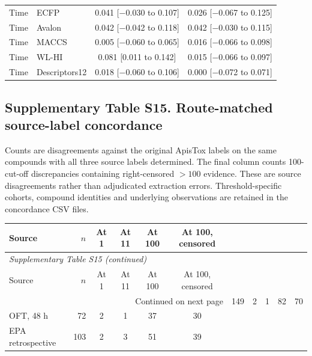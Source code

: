 \begin{longtable}{llcc}
Time & ECFP & 0.041 [$-$0.030 to 0.107] & 0.026 [$-$0.067 to 0.125] \\

Time & Avalon & 0.042 [$-$0.042 to 0.118] & 0.042 [$-$0.030 to 0.115] \\

Time & MACCS & 0.005 [$-$0.060 to 0.065] & 0.016 [$-$0.066 to 0.098] \\

Time & WL-HI & 0.081 [0.011 to 0.142] & 0.015 [$-$0.066 to 0.097] \\

Time & Descriptors12 & 0.018 [$-$0.060 to 0.106] & 0.000 [$-$0.072 to 0.071] \\

\end{longtable}\endgroup

\subsection*{Supplementary Table S15. Route-matched source-label concordance}

Counts are disagreements against the original ApisTox labels on the same compounds with all three source labels determined. The final column counts 100-cut-off discrepancies containing right-censored $>100$ evidence. These are source disagreements rather than adjudicated extraction errors. Threshold-specific cohorts, compound identities and underlying observations are retained in the concordance CSV files.

\begingroup\small\setlength{\tabcolsep}{4pt}

\begin{longtable}{lrcccc}

\toprule Source & $n$ & At 1 & At 11 & At 100 & At 100, censored \\ \midrule\endfirsthead

\multicolumn{6}{l}{\textit{Supplementary Table S15 (continued)}} \\

\toprule Source & $n$ & At 1 & At 11 & At 100 & At 100, censored \\ \midrule\endhead

\midrule\multicolumn{6}{r}{Continued on next page}\endfoot\bottomrule\endlastfoot

OFT & 149 & 2 & 1 & 82 & 70 \\
OFT, 48 h & 72 & 2 & 1 & 37 & 30 \\
EPA retrospective & 103 & 2 & 3 & 51 & 39 \\

\end{longtable}\endgroup

